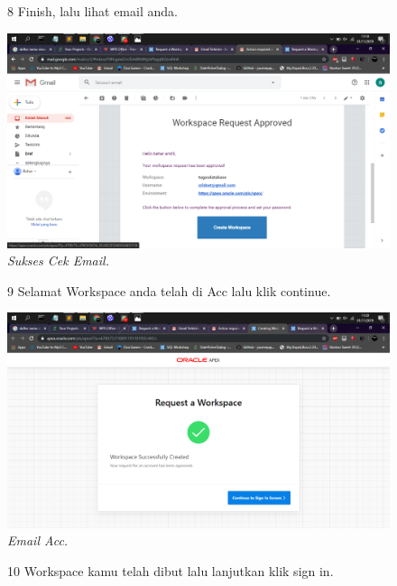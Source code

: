 \begin{enumerate}
\begin{figure}
\item[8] Finish, lalu lihat email anda.

    \begin{center}
\includegraphics[scale=0.2]{figures/7.png}
    \caption{\textit{Sukses Cek Email.}}
        \end{center}
\label{gambar}
\end{figure}

\begin{figure}
\item[9] Selamat Workspace anda telah di Acc lalu klik continue.

    \begin{center}
\includegraphics[scale=0.2]{figures/8.png}
    \caption{\textit{Email Acc.}}
        \end{center}
\label{gambar}
\end{figure}

\begin{figure}
\item[10] Workspace kamu telah dibut lalu lanjutkan klik sign in.


\end{figure}
\end{enumerate}
